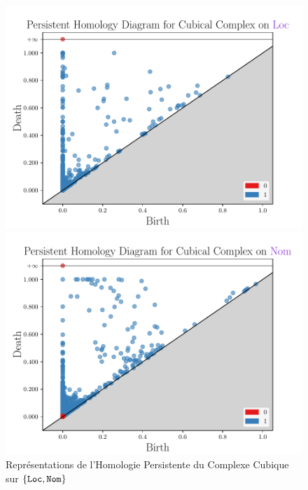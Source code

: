 \documentclass{cours}
\begin{document}
\begin{figure}[H]
\begin{minipage}{.5\textwidth}
	\begin{center}
	\includegraphics[width=\linewidth]{Figures/Visualisations/cc_Loc}
	\end{center}
\end{minipage}
\begin{minipage}{.5\textwidth}
	\begin{center}
	\includegraphics[width=\linewidth]{Figures/Visualisations/cc_Nom}
	\end{center}
\end{minipage}
\caption{Représentations de l'Homologie Persistente du Complexe Cubique sur $\{\tt Loc,Nom\}$}
\end{figure}
\end{document}
